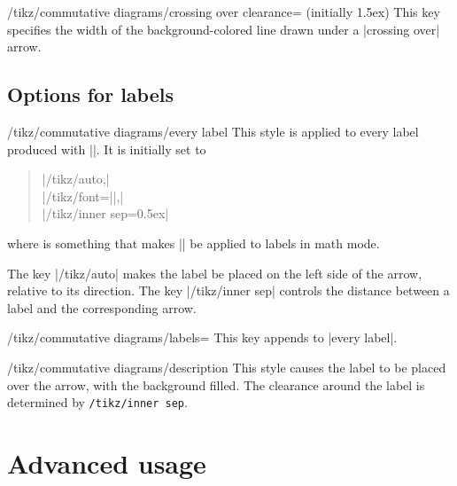 \documentclass[a4paper]{ltxdoc}
\begin{document}
\begin{key}{/tikz/commutative diagrams/crossing over clearance=
    (initially 1.5ex)}
  This key specifies the width of the background-colored line drawn
  under a |crossing over| arrow.
\end{key}

\subsection{Options for labels}
\label{sec:options-labels}

\begin{stylekey}{/tikz/commutative diagrams/every label}
  This style is applied to every label produced with |\arrow|.  It is initially set
  to

\begin{quote}
|/tikz/auto,|\\
|/tikz/font=||,|\\
|/tikz/inner sep=0.5ex|
\end{quote}
where  is something that makes |\scriptstyle| be
applied to labels in math mode.
\end{stylekey}

The key |/tikz/auto| makes the label be placed on the left side of the
arrow, relative to its direction.  The key |/tikz/inner sep| controls
the distance between a label and the corresponding arrow.

\begin{key}{/tikz/commutative diagrams/labels=}
  This key appends  to |every label|.
\end{key}

\begin{stylekey}{/tikz/commutative diagrams/description}
  This style causes the label to be placed over the arrow, with the
  background filled.  The clearance around the label is determined by
  \texttt{/tikz/inner sep}.

\begin{codeexample}[]
\end{codeexample}
\end{stylekey}

\section{Advanced usage}
\label{sec:advanced-usage}
\end{document}
